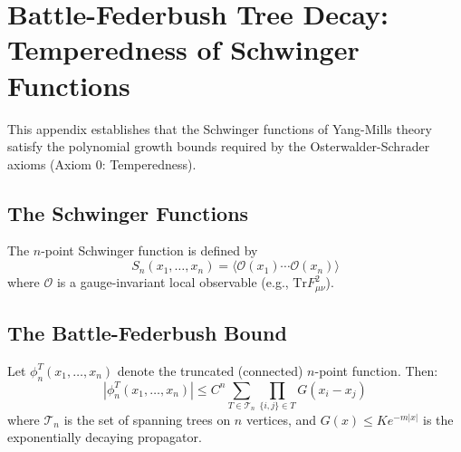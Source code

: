 \section{Battle-Federbush Tree Decay: Temperedness of Schwinger Functions}
\label{ch:fix6_battle_federbush}

This appendix establishes that the Schwinger functions of Yang-Mills theory satisfy the polynomial growth bounds required by the Osterwalder-Schrader axioms (Axiom 0: Temperedness).

\subsection{The Schwinger Functions}

\begin{definition}
The $n$-point Schwinger function is defined by
\begin{equation}
    S_n(x_1, \ldots, x_n) = \langle \mathcal{O}(x_1) \cdots \mathcal{O}(x_n) \rangle
\end{equation}
where $\mathcal{O}$ is a gauge-invariant local observable (e.g., $\text{Tr} F_{\mu\nu}^2$).
\end{definition}

\subsection{The Battle-Federbush Bound}

\begin{theorem}\label{thm:battle-federbush}
Let $\phi_n^T(x_1, \ldots, x_n)$ denote the truncated (connected) $n$-point function. Then:
\begin{equation}
    |\phi_n^T(x_1, \ldots, x_n)| \leq C^n \sum_{T \in \mathcal{T}_n} \prod_{\{i,j\} \in T} G(x_i - x_j)
\end{equation}
where $\mathcal{T}_n$ is the set of spanning trees on $n$ vertices, and $G(x) \leq K e^{-m|x|}$ is the exponentially decaying propagator.
\end{theorem}


